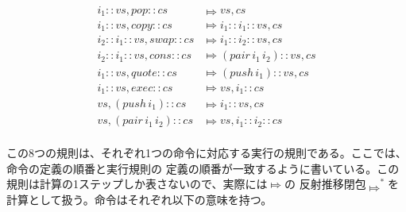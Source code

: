 \documentclass[a4paper, 10pt, twocolumn, titlepage]{ujarticle}
\renewcommand{\{}{\symbol{"7B}}
\renewcommand{\}}{\symbol{"7D}}
\begin{document}
\begin{align*}
 i_1 :: vs , \mathit{pop} :: cs           & \Mapsto vs , cs \\
 i_1 :: vs , \mathit{copy} :: cs          & \Mapsto i_1 :: i_1 :: vs , cs \\
 i_2 :: i_1 :: vs , \mathit{swap} :: cs   & \Mapsto i_1 :: i_2 :: vs, cs \\
 i_2 :: i_1 :: vs , \mathit{cons} :: cs   & \Mapsto (\mathit{pair} \, i_1 \, i_2) :: vs , cs \\
 i_1 :: vs , \mathit{quote} :: cs         & \Mapsto (\mathit{push} \, i_1) :: vs , cs \\
 i_1 :: vs , \mathit{exec} :: cs          & \Mapsto vs , i_1 :: cs \\
 vs , (\mathit{push} \, i_1) :: cs        & \Mapsto i_1 :: vs , cs \\
 vs , (\mathit{pair} \, i_1 \, i_2) :: cs & \Mapsto vs , i_1 :: i_2 :: cs \\
\end{align*}

この8つの規則は、それぞれ1つの命令に対応する実行の規則である。ここでは、命令の定義の順番と実行規則の
定義の順番が一致するように書いている。この規則は計算の1ステップしか表さないので、実際には$\Mapsto$の
反射推移閉包$\Mapsto^*$を計算として扱う。命令はそれぞれ以下の意味を持つ。
\end{document}
